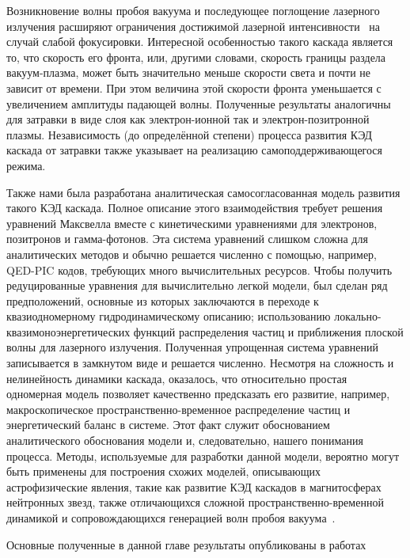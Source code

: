 Возникновение волны пробоя вакуума и последующее поглощение лазерного излучения расширяют ограничения достижимой лазерной интенсивности~\cite{Bell2008, fedotov2010limitations} на случай слабой фокусировки.
Интересной особенностью такого каскада является то, что скорость его фронта, или, другими словами, скорость границы раздела вакуум-плазма, может быть значительно меньше скорости света и почти не зависит от времени.
При этом величина этой скорости фронта уменьшается с увеличением амплитуды падающей волны.
Полученные результаты аналогичны для затравки в виде слоя как электрон-ионной так и электрон-позитронной плазмы.
Независимость (до определённой степени) процесса развития КЭД каскада от затравки также указывает на реализацию самоподдерживающегося режима.

Также нами была разработана аналитическая самосогласованная модель развития такого КЭД каскада.
Полное описание этого взаимодействия требует решения уравнений Максвелла вместе с кинетическими уравнениями для электронов, позитронов и гамма-фотонов.
Эта система уравнений слишком сложна для аналитических методов и обычно решается численно с помощью, например, QED-PIC кодов, требующих много вычислительных ресурсов.
Чтобы получить редуцированные уравнения для вычислительно легкой модели, был сделан ряд предположений, основные из которых заключаются в переходе к квазиодномерному гидродинамическому описанию; использованию локально-квазимоноэнергетических функций распределения частиц и приближения плоской волны для лазерного излучения.
Полученная упрощенная система уравнений записывается в замкнутом виде и решается численно.
Несмотря на сложность и нелинейность динамики каскада, оказалось, что относительно простая одномерная модель позволяет качественно предсказать его развитие, например, макроскопическое пространственно-временное распределение частиц и энергетический баланс в системе.
Этот факт служит обоснованием аналитического обоснования модели и, следовательно, нашего понимания процесса.
Методы, используемые для разработки данной модели, вероятно могут быть применены для построения схожих моделей, описывающих астрофизические явления, такие как развитие КЭД каскадов в магнитосферах нейтронных звезд, также отличающихся сложной пространственно-временной динамикой и сопровождающихся генерацией волн пробоя вакуума~\cite{timokhin2010time}.

Основные полученные в данной главе результаты опубликованы в работах~\cite{samsonov2019laser, samsonov2021hydrodynamical, samsonov2021effect, samsonov2018NW, samsonov2019FNP, samsonov2020NW, samsonov2020UFL, samsonov2021UFL}

\FloatBarrier
